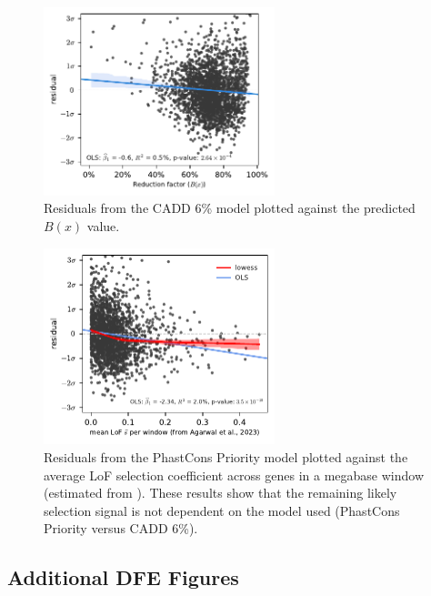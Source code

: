 \documentclass[11pt]{article}
\begin{document}
\begin{figure}[htbp]
  \label{suppfig:resid-b}
  \centering
  \includegraphics[width=0.6\textwidth]{figures/supplementary/b_resid.pdf}
  \caption{Residuals from the CADD 6\% model plotted against the predicted $B(x)$
           value.}
\end{figure}

\begin{figure}[htbp]
  \label{suppfig:resid-pc-fit}
  \centering
  \includegraphics[width=0.6\textwidth]{figures/supplementary/phastcons_resid_lof.pdf}
  \caption{Residuals from the PhastCons Priority model plotted against the
  average LoF selection coefficient across genes in a megabase window
(estimated from \cite{Agarwal2023-un}). These results show that the remaining likely 
selection signal is not dependent on the model used (PhastCons Priority versus CADD 6\%).}
\end{figure}

\subsection{Additional DFE Figures}
\end{document}
